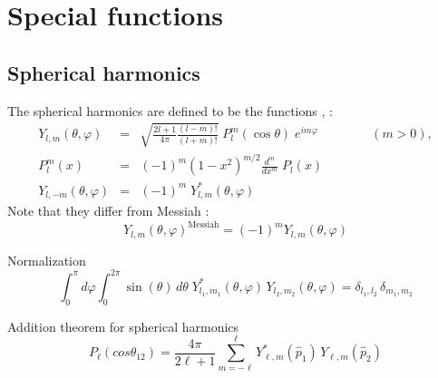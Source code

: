\chapter{Special functions}
\label{S:spfunc}


\section{Spherical harmonics}
\label{S:Spher-harmon} The spherical harmonics are defined to be the
functions \cite[(A.31,A.21)]{Galindo1990_QMvI}, \cite[(6.8.2-6.8.4)]{Press1966_NRIvI}:
\begin{eqnarray}\label{Q:SphA1}
 Y_{l,m}(\theta,\varphi) &=& \sqrt{\frac{2 l + 1}{4
\pi}\frac{(l-m)!}{(l+m)!}} \; P^{m}_{l}(\cos \theta )\; e^{i m
\varphi} \qquad \qquad \, (m>0),
\\
P^{m}_{l}(x) &=& (-1)^{m} \left( 1 -x^{2} \right)^{m/2}
  \frac{d^{m}}{d x^{m}} \; P_{l}(x) \nonumber
\\
Y_{l,-m}(\theta,\varphi)&=& (-1)^{m} \; Y^{*}_{l,m}(\theta,\varphi)
\nonumber
\end{eqnarray}
Note that they differ from Messiah \cite[(92,93)]{Messiah1966_QMvI}:
\[
Y_{l,m}(\theta,\varphi)^{\mathrm{Messiah}} = (-1)^{m} Y_{l,m}(\theta,\varphi)
\]

Normalization
\begin{equation}\label{Q:Sph-norma}
\int_{0}^{\pi} d \varphi \int_{0}^{2 \pi} \sin{(\theta)}\, d
\theta \; Y^{*}_{l_{1},m_{1}}(\theta,\varphi) \,
Y_{l_{2},m_{2}}(\theta,\varphi) = \delta_{l_{1},l_{2}}\,
\delta_{m_{1},m_{2}}
\end{equation}

Addition theorem for spherical harmonics
\begin{equation}\label{Q:sphA2}
P_{\ell}(cos \theta_{12}) = \frac{4 \pi}{2 \ell +1}
\sum_{m=-\ell}^{\ell} Y^{*}_{\ell,m}(\hat{p}_{1}) \,
Y_{\ell,m}(\hat{p}_{2})
\end{equation}


